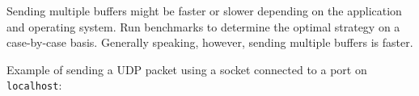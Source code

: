 Sending multiple buffers might be faster or slower depending on the
application and operating system. Run benchmarks to determine the
optimal strategy on a case-by-case basis. Generally speaking, however,
sending multiple buffers is faster.

Example of sending a UDP packet using a socket connected to a port on
\texttt{localhost}:

\begin{Shaded}
\begin{Highlighting}[]
 \OperatorTok{;}
\NormalTok{ \{ }\NormalTok{ \} } \OperatorTok{;}

\OperatorTok{=} \NormalTok{(}\NormalTok{)}\OperatorTok{;}
\OperatorTok{=}\NormalTok{(}\NormalTok{)}\OperatorTok{;}
\NormalTok{(}\OperatorTok{,} \OperatorTok{,}\KeywordTok{=\textgreater{}}\NormalTok{ \{}
\OperatorTok{,}\KeywordTok{=\textgreater{}}\NormalTok{ \{}
\NormalTok{()}\OperatorTok{;}
\NormalTok{  \})}\OperatorTok{;}
\NormalTok{\})}\OperatorTok{;}
\end{Highlighting}
\end{Shaded}

